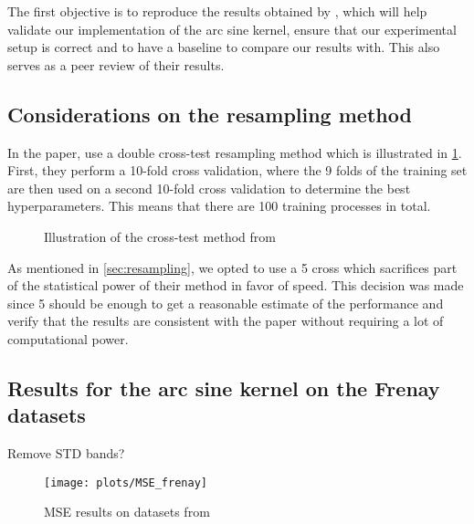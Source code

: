 The first objective is to reproduce the results obtained by
\textcite{frenayParameterinsensitiveKernelExtreme2011}, which will help validate
our implementation of the arc sine kernel, ensure that our experimental setup is
correct and to have a baseline to compare our results with. This also serves as
a peer review of their results.

\subsection{Considerations on the resampling method}

In the paper, \citeauthor{frenayParameterinsensitiveKernelExtreme2011} use a
double cross-test resampling method which is illustrated in
\cref{fig:frenay-cross-test}. First, they perform a 10-fold cross validation,
where the 9 folds of the training set are then used on a second 10-fold cross
validation to determine the best hyperparameters. This means that there are 100
training processes in total.

\begin{figure}[H]
    
    \caption{Illustration of the cross-test method from \cite{frenayParameterinsensitiveKernelExtreme2011}}
    \label{fig:frenay-cross-test}
\end{figure}

As mentioned in \cref{sec:resampling}, we opted to use a 5 cross
which sacrifices part of the statistical power of their method in favor of
speed. This decision was made since 5 should be enough to get a
reasonable estimate of the performance and verify that the results are
consistent with the paper without requiring a lot of computational power.

\subsection{Results for the arc sine kernel on the Frenay datasets}

\begin{important}
    Remove STD bands?
\end{important}
\begin{figure}[H]
    \texttt{[image: plots/MSE\_frenay]}
    \caption{MSE results on datasets from \cite{frenayParameterinsensitiveKernelExtreme2011}}
    \label{fig:mse-frenay}
\end{figure}

